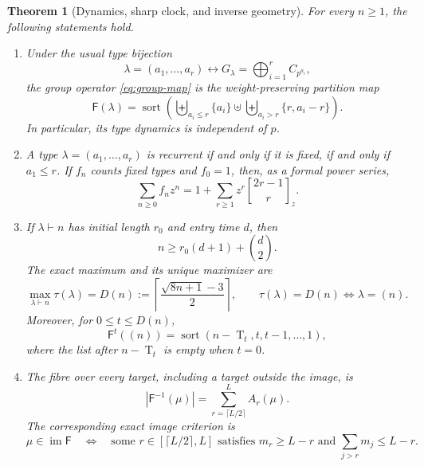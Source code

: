 \documentclass[10pt,a4paper]{amsart}
\newtheorem{theorem}{Theorem}[section]
\theoremstyle{definition}
\theoremstyle{remark}
\newcommand{\RF}{\mathsf F}
\newcommand{\T}{\operatorname T}
\begin{document}
\begin{theorem}[Dynamics, sharp clock, and inverse geometry]\label{thm:main}
For every $n\geq1$, the following statements hold.
\begin{enumerate}[label=\textup{(\roman*)}]
\item Under the usual type bijection
\[
 \lambda=(a_1,\ldots,a_r)\longleftrightarrow
 G_\lambda=\bigoplus_{i=1}^{r}C_{p^{a_i}},
\]
the group operator \eqref{eq:group-map} is the weight-preserving partition
map
\begin{equation}\label{eq:type-map}
 \RF(\lambda)=\operatorname{sort}
 \left(\biguplus_{a_i\leq r}\{a_i\}
       \uplus\biguplus_{a_i>r}\{r,a_i-r\}\right).
\end{equation}
In particular, its type dynamics is independent of $p$.
\item A type $\lambda=(a_1,\ldots,a_r)$ is recurrent if and only if it is
fixed, if and only if $a_1\leq r$.  If $f_n$ counts fixed types and
$f_0=1$, then, as a formal power series,
\begin{equation}\label{eq:fixed-ogf}
 \sum_{n\geq0}f_nz^n
   =1+\sum_{r\geq1}z^r
       \genfrac{[}{]}{0pt}{}{2r-1}{r}_{\!z}.
\end{equation}
\item If $\lambda\vdash n$ has initial length $r_0$ and entry time $d$, then
\begin{equation}\label{eq:pointwise-clock}
                         n\geq r_0(d+1)+\binom d2.
\end{equation}
The exact maximum and its unique maximizer are
\begin{equation}\label{eq:sharp-clock}
 \max_{\lambda\vdash n}\tau(\lambda)
  =D(n):=\left\lceil\frac{\sqrt{8n+1}-3}{2}\right\rceil,
 \qquad \tau(\lambda)=D(n)\Longleftrightarrow\lambda=(n).
\end{equation}
Moreover, for $0\leq t\leq D(n)$,
\begin{equation}\label{eq:deep-orbit}
 \RF^t((n))=\operatorname{sort}(n-\T_t,t,t-1,\ldots,1),
\end{equation}
where the list after $n-\T_t$ is empty when $t=0$.
\item The fibre over every target, including a target outside the image, is
\begin{equation}\label{eq:fibre-formula}
 |\RF^{-1}(\mu)|=
 \sum_{r=\lceil L/2\rceil}^{L}A_r(\mu).
\end{equation}
The corresponding exact image criterion is
\begin{equation}\label{eq:image-criterion}
 \mu\in\operatorname{im}\RF
 \quad\Longleftrightarrow\quad
 \text{some }r\in[\lceil L/2\rceil,L]\text{ satisfies }
 m_r\geq L-r\text{ and }\sum_{j>r}m_j\leq L-r.
\end{equation}
\end{enumerate}
\end{theorem}
\end{document}
